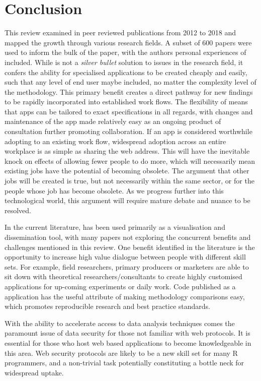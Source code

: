\section{Conclusion}
This review examined  in peer reviewed publications from 2012 to 2018 and mapped the growth through various research fields.  A subset of 600 papers were used to inform the bulk of the paper, with the authors personal experiences of  included.  While  is not a \textit{silver bullet} solution to issues in the research field, it confers the ability for specialised applications to be created cheaply and easily, such that any level of end user maybe included, no matter the complexity level of the methodology.  This primary benefit creates a direct pathway for new findings to be rapidly incorporated into established work flows.  The flexibility of  means that apps can be tailored to exact specifications in all regards, with changes and maintenance of the app made relatively easy as an ongoing product of consultation further promoting collaboration.  If an app is considered worthwhile adopting to an existing work flow, widespread adoption across an entire workplace is as simple as sharing the web address.  This will have the inevitable knock on effects of allowing fewer people to do more, which will necessarily mean existing jobs have the potential of becoming obsolete. The argument that other jobs will be created is true, but not necessarily within the same sector, or for the people whose job has become obsolete. As we progress further into this technological world, this argument will require mature debate and nuance to be resolved.

In the current literature,  has been used primarily as a visualisation and dissemination tool, with many papers not exploring the concurrent benefits and challenges mentioned in this review.  One benefit identified in the literature is the opportunity to increase high value dialogue between people with different skill sets.  For example, field researchers, primary producers or marketers are able to sit down with theoretical researchers/consultants to create highly customised applications for up-coming experiments or daily work.  Code published as a  application has the useful attribute of making methodology comparisons easy, which promotes reproducible research and best practice standards.  

With the ability to accelerate access to data analysis techniques comes the paramount issue of data security for those not familiar with web protocols.  It is essential for those who host web based applications to become knowledgeable in this area.  Web security protocols are likely to be a new skill set for many R programmers, and a non-trivial task potentially constituting a bottle neck for widespread  uptake.

